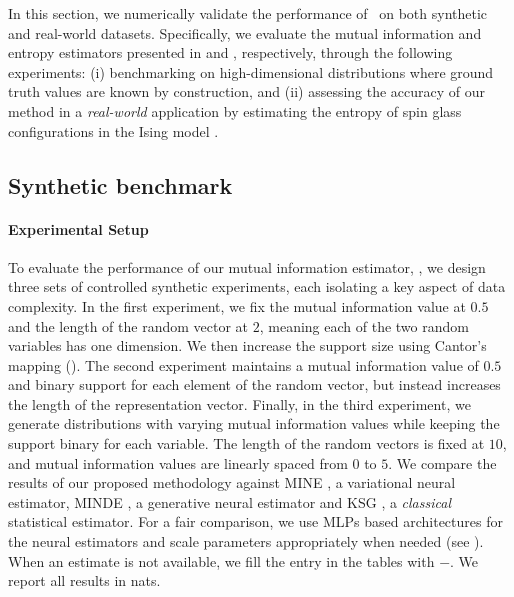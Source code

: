 In this section, we numerically validate the performance of \infosedd\ on both synthetic and real-world datasets. Specifically, we evaluate the mutual information and entropy estimators presented in  and , respectively, through the following experiments: (i) benchmarking on high-dimensional distributions where ground truth values are known by construction, and (ii) assessing the accuracy of our method in a \textit{real-world} application by estimating the entropy of spin glass configurations in the Ising model \citep{onsager1944crystal}.



\subsection{Synthetic benchmark}\label{sec:synthetic}




\paragraph{Experimental Setup} To evaluate the performance of our mutual information estimator, \infosedd, we design three sets of controlled synthetic experiments, each isolating a key aspect of data complexity. In the first experiment, we fix the mutual information value at $0.5$ and the length of the random vector at $2$, meaning each of the two random variables has one dimension. We then increase the support size using Cantor's mapping (). The second experiment maintains a mutual information value of $0.5$ and binary support for each element of the random vector, but instead increases the length of the representation vector. Finally, in the third experiment, we generate distributions with varying mutual information values while keeping the support binary for each variable. The length of the random vectors is fixed at $10$, and mutual information values are linearly spaced from $0$ to $5$. We compare the results of our proposed methodology against MINE \citep{belghazi2018mine}, a variational neural estimator, MINDE \citep{franzese2023minde}, a generative neural estimator and KSG \citep{kraskov2004estimating}, a \textit{classical} statistical estimator. For a fair comparison, we use \glspl{MLP} based architectures for the neural estimators and scale parameters appropriately when needed (see ). When an estimate is not available, we fill the entry in the tables with $-$. We report all results in nats.


